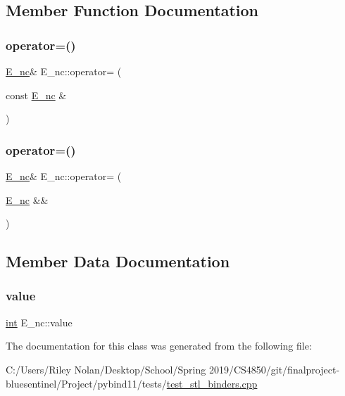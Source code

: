 \subsection{Member Function Documentation}
\mbox{\label{class_e__nc_aa03284dc9f6a270b67d05cbdf685326d}} 
\subsubsection{\texorpdfstring{operator=()}{operator=()}\hspace{0.1cm}{\footnotesize\ttfamily [1/2]}}
{\footnotesize\ttfamily \mbox{\hyperlink{class_e__nc}{E\+\_\+nc}}\& E\+\_\+nc\+::operator= (\begin{DoxyParamCaption}\item[{const \mbox{\hyperlink{class_e__nc}{E\+\_\+nc}} \&}]{ }\end{DoxyParamCaption})\hspace{0.3cm}{\ttfamily [delete]}}

\mbox{\label{class_e__nc_a0425e50093013a3602f4e273d34f044f}} 
\subsubsection{\texorpdfstring{operator=()}{operator=()}\hspace{0.1cm}{\footnotesize\ttfamily [2/2]}}
{\footnotesize\ttfamily \mbox{\hyperlink{class_e__nc}{E\+\_\+nc}}\& E\+\_\+nc\+::operator= (\begin{DoxyParamCaption}\item[{\mbox{\hyperlink{class_e__nc}{E\+\_\+nc}} \&\&}]{ }\end{DoxyParamCaption})\hspace{0.3cm}{\ttfamily [default]}}



\subsection{Member Data Documentation}
\mbox{\label{class_e__nc_a256331222685f023760f3604f0a41454}} 
\subsubsection{\texorpdfstring{value}{value}}
{\footnotesize\ttfamily \mbox{\hyperlink{warnings_8h_a74f207b5aa4ba51c3a2ad59b219a423b}{int}} E\+\_\+nc\+::value}



The documentation for this class was generated from the following file\+:\begin{DoxyCompactItemize}
\item 
C\+:/\+Users/\+Riley Nolan/\+Desktop/\+School/\+Spring 2019/\+C\+S4850/git/finalproject-\/bluesentinel/\+Project/pybind11/tests/\mbox{\hyperlink{test__stl__binders_8cpp}{test\+\_\+stl\+\_\+binders.\+cpp}}\end{DoxyCompactItemize}
